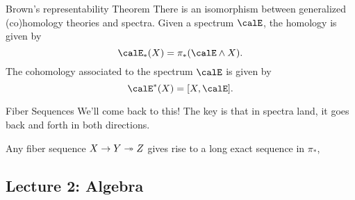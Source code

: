 \begin{theorem}{Brown's representability Theorem}{}
    There is an isomorphism between generalized (co)homology theories and spectra. Given a spectrum $\calE$, the homology is given by $$\calE_\ast(X) = \pi_\ast(\calE\wedge X).$$ The cohomology associated to the spectrum $\calE$ is given by $$\calE^\ast(X) = [X,\calE].$$
\end{theorem}

\begin{definition}{Fiber Sequences}{}
    We'll come back to this! The key is that in spectra land, it goes back and forth in both directions. 
\end{definition}

\begin{fact}{}{}
    Any fiber sequence $X\to Y\twoheadrightarrow Z$ gives rise to a long exact sequence in $\pi_\ast$, %
    \begin{center}
    \end{center}
\end{fact}

\newpage

\subsection{Lecture 2: Algebra}

